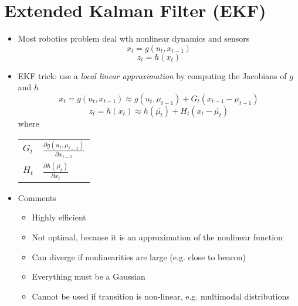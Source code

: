 \documentclass[../main.tex]{subfiles}
\makeatletter
\newenvironment{conditions}
  {\\ \vspace{\abovedisplayskip}\noindent\begin{tabular}{>{$}l<{$} @{${}={}$} l}}
  {\end{tabular}\par\vspace{\belowdisplayskip}}
\makeatother
\begin{document}
\section{Extended Kalman Filter (EKF)}
  \begin{itemize}
      \item Most robotics problem deal wth nonlinear dynamics and sensors
      \begin{equation*}
        x_{t} = g(u_{t}, x_{t-1})
      \end{equation*}
      \begin{equation*}
        z_{t} = h(x_{t})
      \end{equation*}
      \item EKF trick: use a \textit{local linear approximation} by computing the Jacobians of $g$ and $h$
      \begin{equation*}
        x_{t} = g(u_{t}, x_{t-1}) \approx g(u_{t}, \mu_{t-1}) + G_{t}(x_{t-1} - \mu_{t-1})
      \end{equation*}
      \begin{equation*}
        z_{t} = h(x_{t}) \approx h(\bar{\mu_{t}}) + H_{t}(x_{t} - \bar{\mu_{t}})
      \end{equation*}
      where
      \begin{conditions}
        G_{t} & $\frac{\partial{g(u_{t}, \mu_{t-1})}}{\partial x_{t-1}}$ \\
        H_{t} & $\frac{\partial h(\bar{\mu_{t}})}{\partial x_{t}}$
      \end{conditions}
      \item Comments
      \begin{itemize}
        \item Highly efficient
        \item Not optimal, because it is an approximation of the nonlinear function
        \item Can diverge if nonlinearities are large (e.g. close to beacon)
        \item Everything must be a Gaussian
        \item Cannot be used if transition is non-linear, e.g. multimodal distributions
      \end{itemize}
  \end{itemize}
\end{document}
